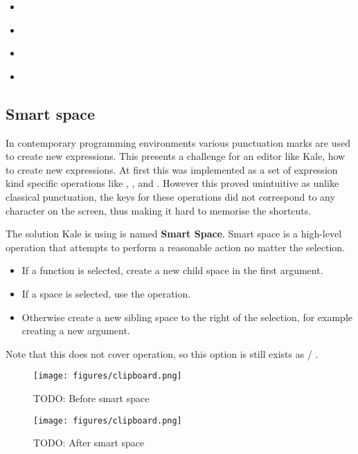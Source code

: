 \begin{itemize}[noitemsep]
	\item \hyperref[cmd:delete]{} \keys{\backspace}
	\item \hyperref[cmd:cut]{} 
	\item \hyperref[cmd:delete_blank]{} 
	\item \hyperref[cmd:cut_blank]{} 
\end{itemize}

\subsection{Smart space}
In contemporary programming environments various punctuation marks are used to
create new expressions. This presents a challenge for an editor like Kale, how
to create new expressions. At first this was implemented as a set of
expression kind specific operations like , , and . However this proved unintuitive as
unlike classical punctuation, the keys for these operations did not correspond
to any character on the screen, thus making it hard to memorise the shortcuts.

The solution Kale is using is named \textbf{Smart Space}. Smart space is a
high-level operation that attempts to perform a reasonable action no matter the
selection.
\begin{itemize}[noitemsep]
	\item If a function is selected, create a new child space in the first
argument.
	\item If a space is selected, use the \hyperref[cmd:up_down]{}
	 operation.
	\item Otherwise create a new sibling space to the right of the selection, for
example creating a new argument.
\end{itemize}

Note that this does not cover  operation, so this option
is still exists as
\hyperref[cmd:new_line]{}  /
\hyperref[cmd:new_line]{} .

\begin{figure}
	\begin{minipage}{0.5\linewidth}
	\centering
	\texttt{[image: figures/clipboard.png]}
	\caption{TODO: Before smart space}
	\end{minipage}
	\qquad
	\begin{minipage}{0.5\linewidth}
	\centering
	\texttt{[image: figures/clipboard.png]}
	\caption{TODO: After smart space}
	\end{minipage}
\end{figure}

